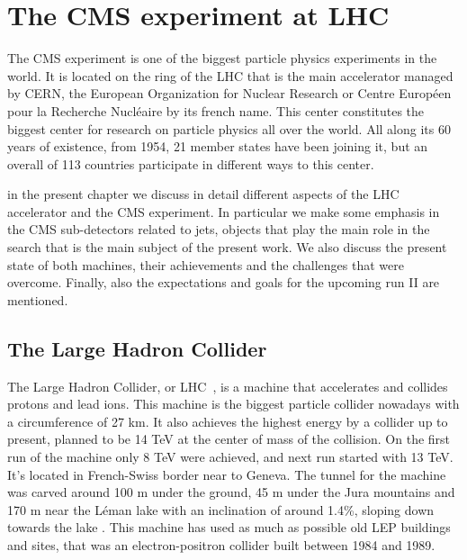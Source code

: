 \chapter[The CMS experiment at LHC]{The CMS experiment at LHC}

The CMS experiment is one of the biggest particle physics experiments in the world. It is located on the ring of the LHC that is the main accelerator managed by CERN, the European Organization for Nuclear Research or Centre Europ\'{e}en pour la Recherche Nucl\'{e}aire by its french name. This center constitutes the biggest center for research on particle physics all over the world. All along its 60 years of existence, from 1954, 21 member states have been joining it, but an overall of 113 countries participate in different ways to this center. 

in the present chapter we discuss in detail different aspects of the LHC accelerator and the CMS experiment. In particular we make some emphasis in the CMS sub-detectors related to jets, objects that play the main role in the search that is the main subject of the present work. We also discuss the present state of both machines, their achievements and the challenges that were overcome. Finally, also the expectations and goals for the upcoming run II are mentioned.  

\section{The Large Hadron Collider}
\label{sec:LHC}

The Large Hadron Collider, or LHC~\cite{Bruning:782076}, is a machine that accelerates and collides protons and lead ions. This machine is the biggest particle collider nowadays with a circumference of 27 km. It also achieves the highest energy by a collider up to present, planned to be 14 TeV at the center of mass of the collision. On the first run of the machine only 8 TeV were achieved, and next run started with 13 TeV. It's located in French-Swiss border near to Geneva. The tunnel for the machine was carved around 100 m under the ground, 45 m under the Jura mountains and 170 m near the L\'{e}man lake with an inclination of around 1.4\%, sloping down towards the lake . This machine has used as much as possible old LEP buildings and sites, that was an electron-positron collider built between 1984 and 1989. 

